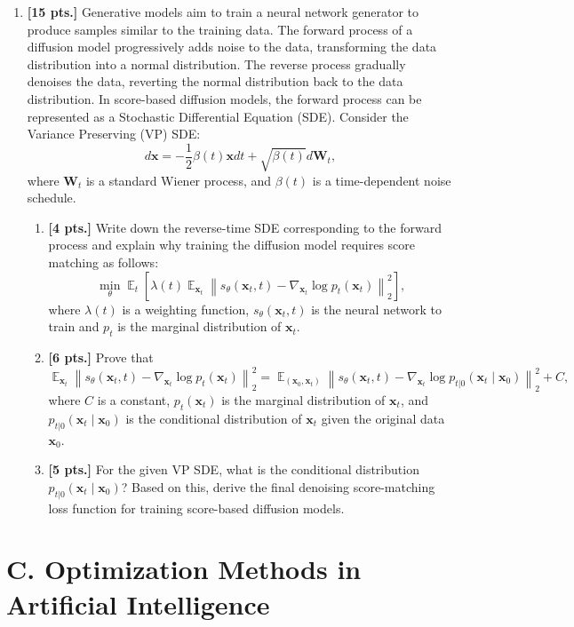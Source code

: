 \documentclass[11pt,a4paper]{article}
\DeclareMathOperator{\E}{\mathbb{E}}
\begin{document}
\begin{enumerate}[label=\textbf{\arabic*.}]
    \item \textbf{[15 pts.]} Generative models aim to train a neural network generator to produce samples similar to the training data. The forward process of a diffusion model progressively adds noise to the data, transforming the data distribution into a normal distribution. The reverse process gradually denoises the data, reverting the normal distribution back to the data distribution. In score-based diffusion models, the forward process can be represented as a Stochastic Differential Equation (SDE). Consider the Variance Preserving (VP) SDE:
    \[
    d\mathbf{x} = -\frac{1}{2}\beta(t)\mathbf{x} dt + \sqrt{\beta(t)} d\mathbf{W}_t,
    \]
    where $\mathbf{W}_t$ is a standard Wiener process, and $\beta(t)$ is a time-dependent noise schedule.
    \begin{enumerate}[label=(\a*)]
        \item \textbf{[4 pts.]} Write down the reverse-time SDE corresponding to the forward process and explain why training the diffusion model requires score matching as follows:
        \[
        \min_{\theta} \E_t \left[ \lambda(t) \E_{\mathbf{x}_t} \left\| s_\theta(\mathbf{x}_t, t) - \nabla_{\mathbf{x}_t} \log p_t(\mathbf{x}_t) \right\|_2^2 \right],
        \]
        where $\lambda(t)$ is a weighting function, $s_\theta(\mathbf{x}_t, t)$ is the neural network to train and $p_t$ is the marginal distribution of $\mathbf{x}_t$.
        \item \textbf{[6 pts.]} Prove that
        \[
        \E_{\mathbf{x}_t} \left\| s_\theta(\mathbf{x}_t, t) - \nabla_{\mathbf{x}_t} \log p_t(\mathbf{x}_t) \right\|_2^2 = \E_{(\mathbf{x}_0, \mathbf{x}_t)} \left\| s_\theta(\mathbf{x}_t, t) - \nabla_{\mathbf{x}_t} \log p_{t|0}(\mathbf{x}_t \mid \mathbf{x}_0) \right\|_2^2 + C,
        \]
        where $C$ is a constant, $p_t(\mathbf{x}_t)$ is the marginal distribution of $\mathbf{x}_t$, and $p_{t|0}(\mathbf{x}_t \mid \mathbf{x}_0)$ is the conditional distribution of $\mathbf{x}_t$ given the original data $\mathbf{x}_0$.
        \item \textbf{[5 pts.]} For the given VP SDE, what is the conditional distribution $p_{t|0}(\mathbf{x}_t \mid \mathbf{x}_0)$? Based on this, derive the final denoising score-matching loss function for training score-based diffusion models.
    \end{enumerate}
\end{enumerate}

\section*{C. Optimization Methods in Artificial Intelligence}
\end{document}
